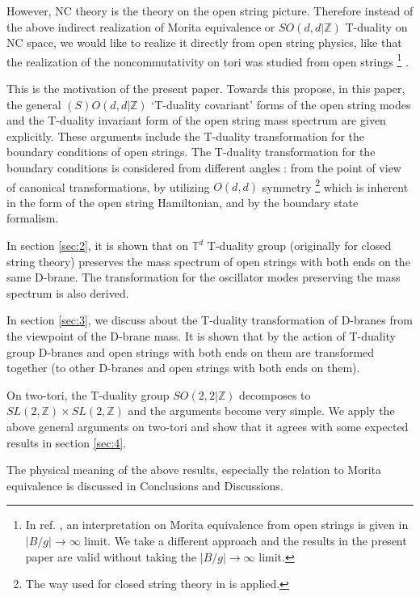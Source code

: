 \documentclass[a4paper,12pt]{article}
\newcommand{\Z}{{\mathbb{Z}}}
\newcommand{\T}{{\mathbb{T}}}
\def \raw{\rightarrow}
\begin{document}
However, NC theory is the theory on the open string picture. 
Therefore instead of the above indirect realization of Morita equivalence 
or $SO(d,d|\Z)$ T-duality on NC space, 
we would like to realize it 
directly from open string physics, 
like that the realization of the noncommutativity 
on tori was studied from open strings \cite{DH,KO,CK}
\footnote{In ref. \cite{SW}, an interpretation on Morita equivalence 
from open strings is given in $|B/g|\raw \infty$ limit. We take a different 
approach and the results in the present paper are valid without taking the 
$|B/g|\raw \infty$ limit. }
. 

This is the motivation of the present paper. Towards this propose, 
in this paper, the general $(S)O(d,d|\Z)$ `T-duality covariant' forms 
of the open string modes and the T-duality invariant form of the 
open string mass spectrum are given explicitly. 
These arguments include the T-duality 
transformation for the boundary conditions of open strings. 
The T-duality transformation for the boundary conditions is considered 
from different angles : 
from the point of view of canonical transformations\cite{J}, 
by utilizing $O(d,d)$ symmetry
\footnote{The way used for closed string theory in \cite{MSch} is applied. } 
which is inherent in the form of the open string Hamiltonian\cite{Ma}, 
and by the boundary state formalism\cite{Kam}. 

In section \ref{sec:2}, it is shown that 
on $\T^d$ T-duality group (originally 
for closed string theory\cite{GPR,MSch}) preserves 
the mass spectrum of open strings with both ends 
on the same D-brane. 
The transformation for the oscillator modes preserving the mass spectrum 
is also derived. 

In section \ref{sec:3}, we discuss about the T-duality transformation 
of D-branes from the viewpoint of the D-brane mass. 
It is shown that 
by the action of T-duality group D-branes and open strings 
with both ends on them are transformed together 
(to other D-branes and open strings with both ends on them). 

On two-tori, the T-duality group $SO(2,2 |\Z)$ decomposes to 
$SL(2,\Z)\times SL(2,\Z)$ and the arguments become very simple. 
We apply the above general arguments on two-tori and show that it 
agrees with some expected results in section \ref{sec:4}. 

The physical meaning of the above results, especially the relation 
to Morita equivalence is discussed in Conclusions and Discussions. 
\end{document}
